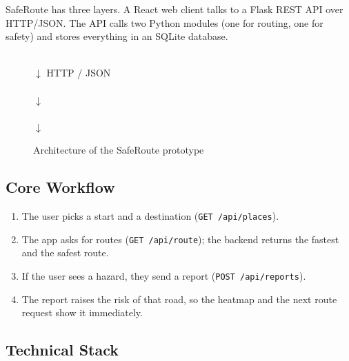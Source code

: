\documentclass{tietreport}
\begin{document}
SafeRoute has three layers. A React web client talks to a Flask REST
API over HTTP/JSON. The API calls two Python modules (one for routing,
one for safety) and stores everything in an SQLite database.

\begin{figure}[h]
\centering
{}\\[3pt]
$\downarrow$ HTTP / JSON \\[3pt]
\\[3pt]
$\downarrow$ \\[3pt]
\hspace{0.02\textwidth}
\\[3pt]
$\downarrow$ \\[3pt]
\caption{Architecture of the SafeRoute prototype}
\label{fig:arch}
\end{figure}

\subsection{Core Workflow}

\begin{enumerate}
  \item The user picks a start and a destination
    (\texttt{GET /api/places}).
  \item The app asks for routes (\texttt{GET /api/route}); the backend
    returns the fastest and the safest route.
  \item If the user sees a hazard, they send a report
    (\texttt{POST /api/reports}).
  \item The report raises the risk of that road, so the heatmap and
    the next route request show it immediately.
\end{enumerate}

\subsection{Technical Stack}
\end{document}
